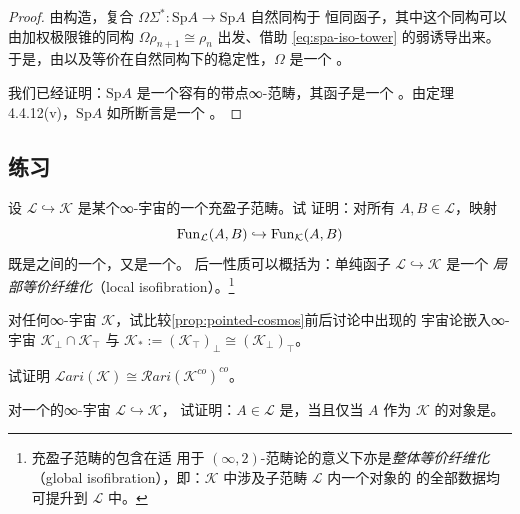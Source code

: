 \begin{proof}
由构造，复合 $\Omega\Sigma^{*}\colon\mathrm{Sp}A\to\mathrm{Sp}A$ 自然同构于
恒同函子，其中这个同构可以由加权极限锥的同构 $\Omega\rho_{n+1}\cong\rho_{n}$
出发、借助\trPullback{} \eqref{eq:spa-iso-tower} 的弱\trUniversalProperty{}诱导出来。
于是，由\trTwoOfThreeProperty{}以及等价在自然同构下的稳定性，$\Omega$ 是一个%
\trEquivalence{}。

我们已经证明：$\mathrm{Sp}A$ 是一个容有\trPullback{}的带点∞-范畴，其\trLoops{}函子是一个%
\trEquivalence{}。由定理 4.4.12(v)，$\mathrm{Sp}A$ 如所断言是一个\trStable{}
\trInfinityCategory{}。
\end{proof}

\subsection*{练习}

\begin{exercise}\label{ex:replete-local-isofibration}
设 $\mathcal{L}\hookrightarrow\mathcal{K}$ 是某个∞-宇宙的一个充盈子范畴。试
证明：对所有 $A,B\in\mathcal{L}$，映射
\[
\operatorname{Fun}_{\mathcal{L}}(A,B)\hookrightarrow\operatorname{Fun}_{\mathcal{K}}(A,B)
\]
既是\trQuasiCategory{}之间的一个\trMonomorphism{}，又是一个\trIsofibration{}。
后一性质可以概括为：单纯函子 $\mathcal{L}\hookrightarrow\mathcal{K}$ 是一个
\emph{局部等价纤维化}（local isofibration）。\footnote{充盈子范畴的包含在适
用于 $(\infty,2)$-范畴论的意义下亦是\emph{整体等价纤维化}（global
isofibration），即：$\mathcal{K}$ 中涉及子范畴 $\mathcal{L}$ 内一个对象的%
\trEquivalence{}的全部数据均可提升到 $\mathcal{L}$ 中。}
\end{exercise}

\begin{exercise}\label{ex:pointed-comparison}
对任何∞-宇宙 $\mathcal{K}$，试比较\cref{prop:pointed-cosmos}前后讨论中出现的
宇宙论嵌入∞-宇宙 $\mathcal{K}_{\perp}\cap\mathcal{K}_{\top}$ 与
$\mathcal{K}_{*}:=(\mathcal{K}_{\top})_{\perp}\cong(\mathcal{K}_{\perp})_{\top}$。
\end{exercise}

\begin{exercise}\label{ex:lari-codual}
试证明 $\mathcal{L}ari(\mathcal{K})\cong\mathcal{R}ari(\mathcal{K}^{co})^{co}$。
\end{exercise}

\begin{exercise}\label{ex:discrete-cart}
对一个\trCosmologicalEmbedding{}的∞-宇宙 $\mathcal{L}\hookrightarrow\mathcal{K}$，
试证明：$A\in\mathcal{L}$ 是\trDiscrete{}，当且仅当 $A$ 作为 $\mathcal{K}$
的对象是\trDiscrete{}。
\end{exercise}

